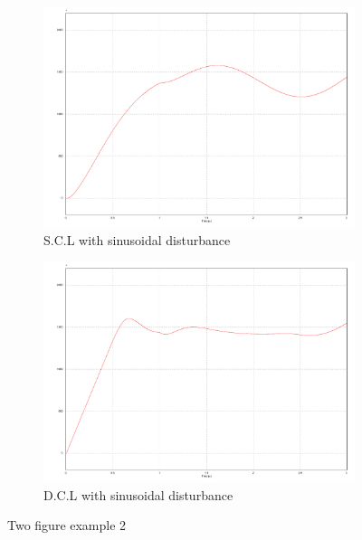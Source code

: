 \documentclass[11pt,english, openany]{book}
\begin{document}
\begin{figure}[h]
	\centering
	\begin{subfigure}{0.49\linewidth} \centering
		\includegraphics[scale=0.25]{Figures/single_sine_perturb}
		\caption{S.C.L with sinusoidal disturbance}\label{fig:figA}
	\end{subfigure}
	\begin{subfigure}{0.49\linewidth} \centering
		\includegraphics[scale=0.25]{Figures/dual_sine_perturb}
		\caption{D.C.L with sinusoidal disturbance}\label{fig:figB}
	\end{subfigure}
	\caption{Two figure example 2} \label{fig:twodisturb}
\end{figure}
\lipsum[5]
\end{document}
